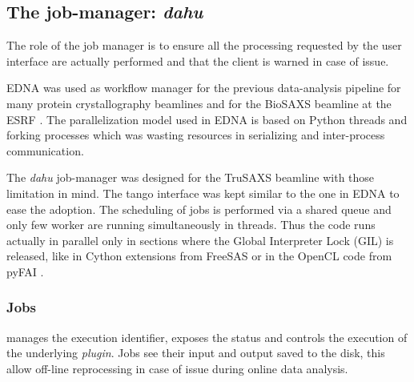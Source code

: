 \documentclass[preprint]{iucr}              %
\begin{document}
\subsection{The job-manager: \textit{dahu}}

The role of the job manager is to ensure all the processing requested by the user interface are actually performed and that the client is warned in case of issue.

EDNA was used as workflow manager for the previous data-analysis pipeline for many protein crystallography beamlines \cite{edna} and for the BioSAXS beamline at the ESRF \cite{BM29ODA}.
The parallelization model used in EDNA is based on Python threads and forking processes which was wasting resources in serializing and inter-process communication. 
 
The \textit{dahu} job-manager was designed for the TruSAXS beamline \cite{id02_2022} with those limitation in mind. 
The tango interface \cite{tango} was kept similar to the one in EDNA to ease the adoption.
The scheduling of jobs is performed via a shared queue and only few worker are running simultaneously in threads.
Thus the code runs actually in parallel only in sections where the Global Interpreter Lock (GIL) is released, like in Cython extensions from FreeSAS or in the OpenCL code from pyFAI \cite{pyFAI_gpu}.

\subsubsection{Jobs}
manages the execution identifier, exposes the status and controls the execution of the underlying \textit{plugin}. %
Jobs see their input and output saved to the disk, this allow off-line reprocessing in case of issue during online data analysis.
\end{document}
